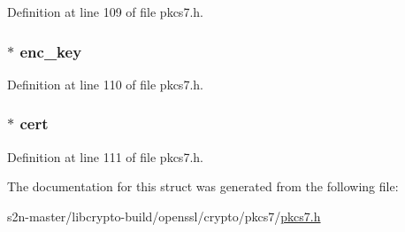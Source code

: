 Definition at line 109 of file pkcs7.\+h.

\subsubsection[{\texorpdfstring{enc\+\_\+key}{enc_key}}]{ $\ast$ enc\+\_\+key}\hypertarget{structpkcs7__recip__info__st_a723a4a8e5a70c01d3670bdfdb0d1ab9b}{}\label{structpkcs7__recip__info__st_a723a4a8e5a70c01d3670bdfdb0d1ab9b}


Definition at line 110 of file pkcs7.\+h.

\subsubsection[{\texorpdfstring{cert}{cert}}]{ $\ast$ cert}\hypertarget{structpkcs7__recip__info__st_a2fb0a168ce33f1f9ce519813d94887f0}{}\label{structpkcs7__recip__info__st_a2fb0a168ce33f1f9ce519813d94887f0}


Definition at line 111 of file pkcs7.\+h.



The documentation for this struct was generated from the following file\+:\begin{DoxyCompactItemize}
\item 
s2n-\/master/libcrypto-\/build/openssl/crypto/pkcs7/\hyperlink{crypto_2pkcs7_2pkcs7_8h}{pkcs7.\+h}\end{DoxyCompactItemize}
